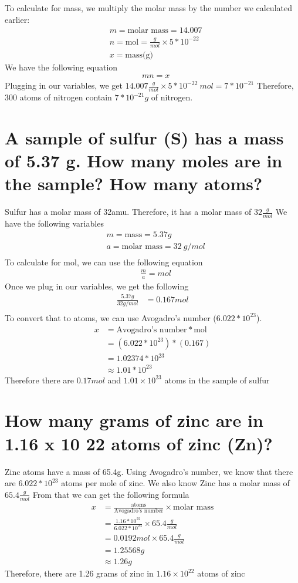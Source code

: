 \documentclass[11pt]{article}
\begin{document}
To calculate for mass, we multiply the molar mass by the number we calculated
earlier:
\begin{align*}
&m=\text{molar mass}=14.007\\
&n=\text{mol}=\frac{g}{mol}\times5*10^{-22}\\
&x=\text{mass(g)}
\end{align*}
We have the following equation
\begin{align*}
&mn=x
\end{align*}
Plugging in our variables, we get
\(14.007 \frac{g}{mol}\times5*10^{-22}\ mol=7*10^{-21}\)
Therefore, 300 atoms of nitrogen contain \(7*10^{-21}g\) of nitrogen.

\section{A sample of sulfur (S) has a mass of 5.37 g. How many moles are in the sample? How many atoms?}
\label{sec:org5849b31}
Sulfur has a molar mass of 32amu. Therefore, it has a molar mass of
\(32\frac{g}{mol}\)
We have the following variables
\begin{align*}
&m=\text{mass}=5.37g\\
&a=\text{molar mass}=32\ g/mol\\
\end{align*}
To calculate for mol, we can use the following equation
\begin{align*}
&\frac{m}{a}=mol
\end{align*}
Once we plug in our variables, we get the following
\begin{align*}
\frac{5.37g}{32g/mol}&=0.167mol\\
\end{align*}
To convert that to atoms, we can use Avogadro's number (\(6.022 *10^{23}\)).
\begin{align*}
x&=\text{Avogadro's number}*\text{mol}\\
&=(6.022*10^{23})*(0.167)\\
&=1.02374*10^{23}\\
&\approx1.01*10^{23}
\end{align*}
Therefore there are \(0.17mol\) and \(1.01\times10^{23}\) atoms in the sample of sulfur

\section{How many grams of zinc are in 1.16 x 10 22 atoms of zinc (Zn)?}
\label{sec:orgfaf011a}
Zinc atoms have a mass of 65.4g. Using Avogadro's number, we know that there are \(6.022 *10^{23}\) atoms per mole of zinc.
We also know Zinc has a molar mass of \(65.4\frac{g}{mol}\)
From that we can get the following formula
\begin{align*}
x&=\frac{\text{atoms}}{\text{Avogadro's number}}\times\text{molar mass}\\
&=\frac{1.16*10^{22}}{6.022*10^{23}}\times65.4 \frac{g}{mol}\\
&=0.0192mol\times65.4\frac{g}{mol}\\
&=1.25568g\\
&\approx1.26g
\end{align*}
Therefore, there are 1.26 grams of zinc in \(1.16\times10^{22}\) atoms  of zinc
\end{document}
